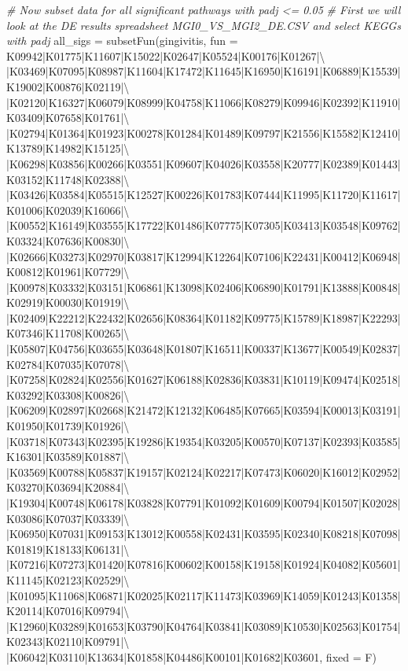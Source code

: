 \documentclass[
]{book}
\newenvironment{Shaded}{\begin{snugshade}}{\end{snugshade}}
\newcommand{\AttributeTok}[1]{\textcolor[rgb]{0.77,0.63,0.00}{#1}}
\newcommand{\CommentTok}[1]{\textcolor[rgb]{0.56,0.35,0.01}{\textit{#1}}}
\newcommand{\FunctionTok}[1]{\textcolor[rgb]{0.00,0.00,0.00}{#1}}
\newcommand{\NormalTok}[1]{#1}
\newcommand{\OtherTok}[1]{\textcolor[rgb]{0.56,0.35,0.01}{#1}}
\newcommand{\StringTok}[1]{\textcolor[rgb]{0.31,0.60,0.02}{#1}}
\begin{document}
\begin{Shaded}
\begin{Highlighting}[]
\CommentTok{\# Now subset data for all significant pathways with padj \textless{}= 0.05}
\CommentTok{\# First we will look at the DE results spreadsheet MGI0\_VS\_MGI2\_DE.CSV and select KEGGs with padj}
\NormalTok{all\_sigs }\OtherTok{=} \FunctionTok{subsetFun}\NormalTok{(gingivitis, }\AttributeTok{fun =} \StringTok{\textquotesingle{}K09942|K01775|K11607|K15022|K02647|K05524|K00176|K01267|\textbackslash{}}
\StringTok{|K03469|K07095|K08987|K11604|K17472|K11645|K16950|K16191|K06889|K15539|K19002|K00876|K02119|\textbackslash{}}
\StringTok{|K02120|K16327|K06079|K08999|K04758|K11066|K08279|K09946|K02392|K11910|K03409|K07658|K01761|\textbackslash{}}
\StringTok{|K02794|K01364|K01923|K00278|K01284|K01489|K09797|K21556|K15582|K12410|K13789|K14982|K15125|\textbackslash{}}
\StringTok{|K06298|K03856|K00266|K03551|K09607|K04026|K03558|K20777|K02389|K01443|K03152|K11748|K02388|\textbackslash{}}
\StringTok{|K03426|K03584|K05515|K12527|K00226|K01783|K07444|K11995|K11720|K11617|K01006|K02039|K16066|\textbackslash{}}
\StringTok{|K00552|K16149|K03555|K17722|K01486|K07775|K07305|K03413|K03548|K09762|K03324|K07636|K00830|\textbackslash{}}
\StringTok{|K02666|K03273|K02970|K03817|K12994|K12264|K07106|K22431|K00412|K06948|K00812|K01961|K07729|\textbackslash{}}
\StringTok{|K00978|K03332|K03151|K06861|K13098|K02406|K06890|K01791|K13888|K00848|K02919|K00030|K01919|\textbackslash{}}
\StringTok{|K02409|K22212|K22432|K02656|K08364|K01182|K09775|K15789|K18987|K22293|K07346|K11708|K00265|\textbackslash{}}
\StringTok{|K05807|K04756|K03655|K03648|K01807|K16511|K00337|K13677|K00549|K02837|K02784|K07035|K07078|\textbackslash{}}
\StringTok{|K07258|K02824|K02556|K01627|K06188|K02836|K03831|K10119|K09474|K02518|K03292|K03308|K00826|\textbackslash{}}
\StringTok{|K06209|K02897|K02668|K21472|K12132|K06485|K07665|K03594|K00013|K03191|K01950|K01739|K01926|\textbackslash{}}
\StringTok{|K03718|K07343|K02395|K19286|K19354|K03205|K00570|K07137|K02393|K03585|K16301|K03589|K01887|\textbackslash{}}
\StringTok{|K03569|K00788|K05837|K19157|K02124|K02217|K07473|K06020|K16012|K02952|K03270|K03694|K20884|\textbackslash{}}
\StringTok{|K19304|K00748|K06178|K03828|K07791|K01092|K01609|K00794|K01507|K02028|K03086|K07037|K03339|\textbackslash{}}
\StringTok{|K06950|K07031|K09153|K13012|K00558|K02431|K03595|K02340|K08218|K07098|K01819|K18133|K06131|\textbackslash{}}
\StringTok{|K07216|K07273|K01420|K07816|K00602|K00158|K19158|K01924|K04082|K05601|K11145|K02123|K02529|\textbackslash{}}
\StringTok{|K01095|K11068|K06871|K02025|K02117|K11473|K03969|K14059|K01243|K01358|K20114|K07016|K09794|\textbackslash{}}
\StringTok{|K12960|K03289|K01653|K03790|K04764|K03841|K03089|K10530|K02563|K01754|K02343|K02110|K09791|\textbackslash{}}
\StringTok{|K06042|K03110|K13634|K01858|K04486|K00101|K01682|K03601\textquotesingle{}}\NormalTok{, }\AttributeTok{fixed =}\NormalTok{ F)}


\end{Highlighting}
\end{Shaded}
\end{document}
